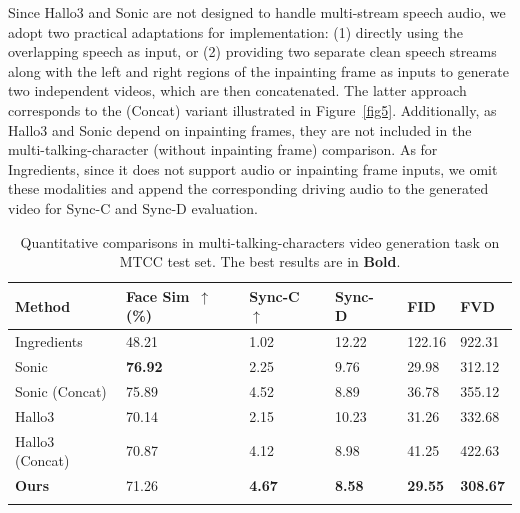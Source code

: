 Since Hallo3 and Sonic are not designed to handle multi-stream speech audio, we adopt two practical adaptations for implementation: (1) directly using the overlapping speech as input, or (2) providing two separate clean speech streams along with the left and right regions of the inpainting frame as inputs to generate two independent videos, which are then concatenated. The latter approach corresponds to the (Concat) variant illustrated in Figure~\ref{fig5}. Additionally, as Hallo3 and Sonic depend on inpainting frames, they are not included in the multi-talking-character (without inpainting frame) comparison. As for Ingredients, since it does not support audio or inpainting frame inputs, we omit these modalities and append the corresponding driving audio to the generated video for Sync-C and Sync-D evaluation.
\begin{table}[t]
    \centering
    \caption{Quantitative comparisons in multi-talking-characters video generation task on MTCC test set. The best results are in \textbf{Bold}.}
    \label{table2}
    \fontsize{6}{6.5}\selectfont
    \setlength{\tabcolsep}{3pt}
    \renewcommand{\arraystretch}{1.4}
    \begin{tabular}{lC{1.5cm}C{1cm}C{1cm}C{0.9cm}C{0.9cm}}
        \hline{}
        \textbf{Method}
        & \textbf{Face Sim~$\uparrow$(\%)}
        & \textbf{Sync-C~$\uparrow$}
        & \textbf{Sync-D~}
        & \textbf{FID~}
        & \textbf{FVD~} \\
        \hline 
        Ingredients& 48.21&	1.02	&12.22&	122.16	&922.31 \\ 
        Sonic & \textbf{76.92}&	2.25	&9.76	&29.98	&312.12\\ 
        Sonic (Concat) & 75.89&	4.52&	8.89&	36.78&	355.12 \\ 
        Hallo3 & 70.14	&2.15	&10.23&	31.26&	332.68 \\ 
        Hallo3 (Concat)&70.87&	4.12&	8.98	&41.25&	422.63\\ 
        \textbf{Ours} &71.26	& \textbf{4.67}&	\textbf{8.58}&	\textbf{29.55}&	\textbf{308.67} \\ 
        \hline{}
    \end{tabular}
\end{table}
